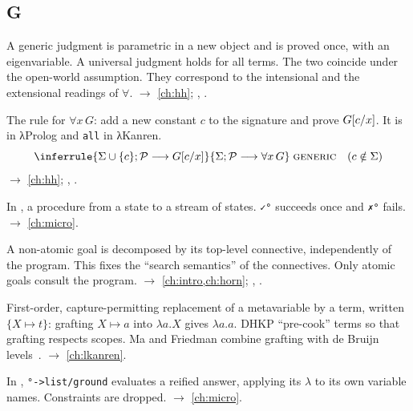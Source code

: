 \subsection*{G}
\begin{glossarylist}
\item[Generic judgment, universal judgment] A generic judgment is parametric in a new object and is proved once,
  with an eigenvariable. A universal judgment holds for all terms. The two coincide under the open-world
  assumption. They correspond to the intensional and the extensional readings of $\forall$.
  $\rightarrow$ \cref{ch:hh}; , .
\item[GENERIC] The rule for $\forall x\,G$: add a new constant $c$ to the signature and prove $G[c/x]$.
  It is  in λProlog and \texttt{all} in λKanren.
  \[\inferrule{\seq{\Sig\cup\{c\}}{\Prog}{\subst{G}{c}{x}}}{\seq{\Sig}{\Prog}{\forall x\,G}}\;\rulename{generic}\quad(c\notin\Sig)\]
  $\rightarrow$ \cref{ch:hh}; , .
\item[Goal (miniKanren)] In \micro{}, a procedure from a state to a stream of states. \texttt{✓°} succeeds once
  and \texttt{✗°} fails. $\rightarrow$ \cref{ch:micro}.
\item[Goal-directed search, goal reduction] A non-atomic goal is decomposed by its top-level connective,
  independently of the program. This fixes the \enquote{search semantics} of the connectives. Only atomic goals
  consult the program. $\rightarrow$ \cref{ch:intro,ch:horn}; , .
\item[Grafting] First-order, capture-permitting replacement of a metavariable by a term, written $\{X\mapsto t\}$:
  grafting $X\mapsto a$ into $\lambda a.X$ gives $\lambda a.a$. DHKP \enquote{pre-cook} terms so that grafting
  respects scopes. Ma and Friedman combine grafting with de Bruijn levels~\cite{MaFriedman2021}.
  $\rightarrow$ \cref{ch:lkanren}.
\item[Grounding] In \micro{}, \texttt{°->list/ground} evaluates a reified answer, applying its $\lambda$ to its own
  variable names. Constraints are dropped. $\rightarrow$ \cref{ch:micro}.
\end{glossarylist}

